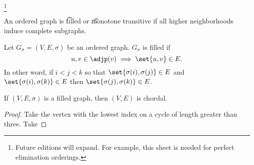 
\footnote{Future editions will expand. For example, this sheet is needed for perfect elimination orderings.}


An ordered graph is \t{filled} or \t{monotone transitive} if all higher neighborhoods induce complete subgraphs.


Let $G_{\sigma} = (V, E, \sigma)$ be an ordered graph.
$G_{\sigma}$ is filled if
$$
  u, v \in \adjp(v) \implies \set{u, v} \in E.
$$
In other word, if $i < j < k$ so that $\set{\sigma(i), \sigma(j)} \in E$ and $\set{\sigma(i), \sigma(k)} \in E$ then $\set{\sigma(j), \sigma(k)} \in E$.


\begin{prop}
  If $(V, E, \sigma)$ is a filled graph, then $(V, E)$ is chordal.

  \begin{proof}
  Take the vertex with the lowest index on a cycle of length greater than three.
  Take
  \end{proof}
\end{prop}

\blankpage
